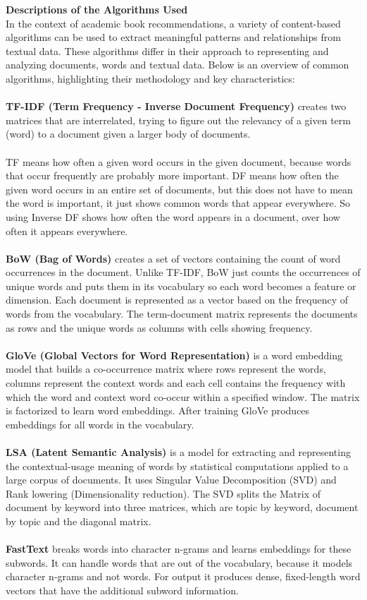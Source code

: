\documentclass{llncs}
\begin{document}
%
%
\textbf{Descriptions of the Algorithms Used}\\
In the context of academic book recommendations, a variety of content-based algorithms can be used to extract meaningful patterns and relationships from textual data. These algorithms differ in their approach to representing and analyzing documents, words and textual data. Below is an overview of common algorithms, highlighting their methodology and key characteristics:\\\\
\textbf{TF-IDF (Term Frequency - Inverse Document Frequency)} creates two matrices that are interrelated, trying to figure out the relevancy of a given term (word) to a document given a larger body of documents.\\\\
TF means how often a given word occurs in the given document, because words that occur frequently are probably more important. DF means how often the given word occurs in an entire set of documents, but this does not have to mean the word is important, it just shows common words that appear everywhere. So using Inverse DF shows how often the word appears in a document, over how often it appears everywhere.\\\\
\textbf{BoW (Bag of Words)} creates a set of vectors containing the count of word occurrences in the document. Unlike TF-IDF, BoW just counts the occurrences of unique words and puts them in its vocabulary so each word becomes a feature or dimension. Each document is represented as a vector based on the frequency of words from the vocabulary. The term-document matrix represents the documents as rows and the unique words as columns with cells showing frequency.\\\\
\textbf{GloVe (Global Vectors for Word Representation)} is a word embedding model that builds a co-occurrence matrix where rows represent the words, columns represent the context words and each cell contains the frequency with which the word and context word co-occur within a specified window. The matrix is factorized to learn word embeddings. After training GloVe produces embeddings for all words in the vocabulary.\\\\
\textbf{LSA (Latent Semantic Analysis)} is a model for extracting and representing the contextual-usage meaning of words by statistical computations applied to a large corpus of documents. It uses Singular Value Decomposition (SVD) and Rank lowering (Dimensionality reduction). The SVD splits the Matrix of document by keyword into three matrices, which are topic by keyword, document by topic and the diagonal matrix.\\\\
\textbf{FastText} breaks words into character n-grams and learns embeddings for these subwords. It can handle words that are out of the vocabulary, because it models character n-grams and not words. For output it produces dense, fixed-length word vectors that have the additional subword information.\\
\end{document}
